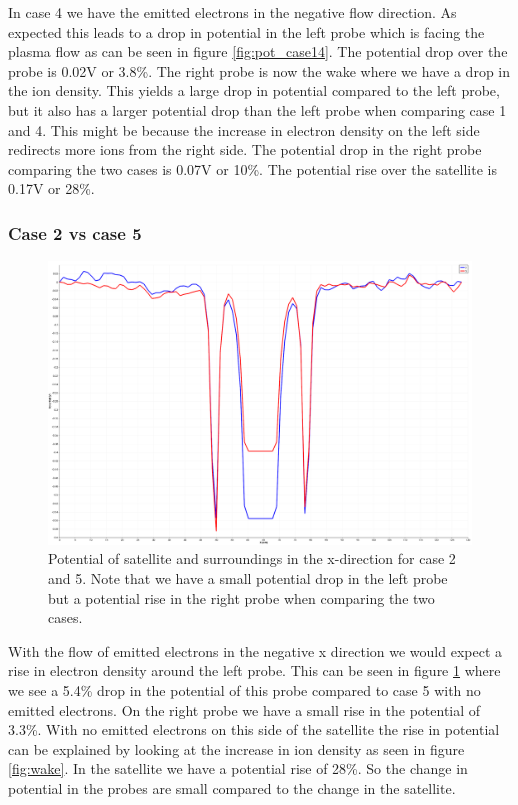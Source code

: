 In case 4 we have the emitted electrons in the negative flow direction. As expected this
leads to a drop in potential in the left probe which is facing the plasma flow as can be seen in figure \ref{fig:pot_case14}. The
potential drop over the probe is 0.02V or 3.8\%. The right probe is now the wake where we have
a drop in the ion density. This yields a large drop in potential compared to the left
probe, but it also has a larger potential drop than the left probe when comparing case 1 and 4. This
might be because the increase in electron density on the left side redirects more ions from the right side.
The potential drop in the right probe comparing the two cases is 0.07V or 10\%. The potential rise over the satellite is 0.17V or 28\%.


\subsubsection{Case 2 vs case 5}
\begin{figure}
    \centering
    \includegraphics[width = 0.6 \textwidth]{images/pot_case25_new.png}
    \caption{Potential of satellite and surroundings in the x-direction for case 2 and 5. Note that we have a small potential drop in the left probe but a potential rise in the right probe when comparing the two cases.}
    \label{fig:pot_case25}
\end{figure}

With the flow of emitted electrons in the negative x direction we would expect a rise in electron density around the left probe.
This can be seen in figure \ref{fig:pot_case25} where we see a 5.4\% drop in the potential of this probe compared to case 5 with no emitted
electrons. On the right probe we have a small rise in the potential of 3.3\%. With no emitted electrons on this side of the satellite the rise in
potential can be explained by looking at the increase in ion density as seen in figure \ref{fig:wake}.
In the satellite we have a potential rise of 28\%. So the change in potential in the probes are small compared to the change in the satellite.

